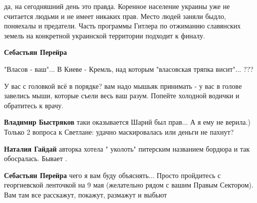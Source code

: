 \begin{itemize}
\begin{itemize}
да, на сегодняшний день это правда. Коренное население украины уже не считается
людьми и не имеет никаких прав. Место людей заняли быдло, поняехалы и
предатели. Часть программы Гитлера по отжиманию славянских земель на конкретной
украинской территории подходит к финалу.



 
\textbf{Себастьян Перейра}

"Власов - ваш"... В Киеве - Кремль, над которым "власовская тряпка висит"...
???

У вас с головкой всё в порядке? вам надо мышьяк принимать - у вас в голове
завелись мыши, которые съели весь ваш разум. Попейте холодной водички и
обратитесь к врачу.

 
\textbf{Владимир Быстряков} таки оказывается Шарий был прав... А я ему не верила.) Только 2 вопроса к Светлане: удачно маскировалась или деньги не пахнут?

 
\textbf{Наталия Гайдай} авторка хотела " уколоть" питерским названием бордюра и так обосралась. Бывает .

 
\textbf{Себастьян Перейра} чего я вам буду объяснять... Просто пройдитесь с георгиевской ленточкой на 9 мая (желательно рядом с вашим Правым Сектором). Вам там все расскажут, покажут, размажут и выбьют

 

\end{itemize}
\end{itemize}
